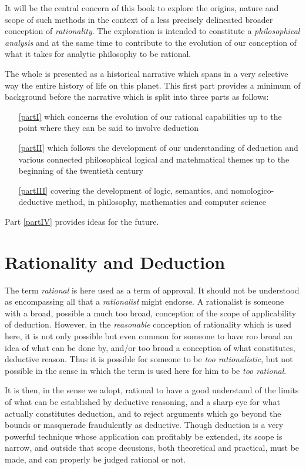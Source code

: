 It will be the central concern of this book to explore the origins, nature and scope of such methods in the context of a less precisely delineated broader conception of \emph{rationality}.
The exploration is intended to constitute a \emph{philosophical analysis} and at the same time to contribute to the evolution of our conception of what it takes for analytic philosophy to be rational.

The whole is presented as a historical narrative which spans in a very selective way the entire history of life on this planet.
This first part provides a minimum of background before the narrative which is split into three parts as follows:

\begin{itemize}
\item[\ref{partI}] which concerns the evolution of our rational capabilities up to the point where they can be said to involve deduction
\item[\ref{partII}] which follows the development of our understanding of deduction and various connected philosophical logical and matehmatical themes up to the beginning of the twentieth century
\item[\ref{partIII}] covering the development of logic, semantics, and nomologico-deductive method, in philosophy, mathematics and computer science
\end{itemize}

Part \ref{partIV} provides ideas for the future.

\section{Rationality and Deduction}

The term \emph{rational} is here used as a term of approval.
It should not be understood as encompassing all that a \emph{rationalist} might endorse.
A rationalist is someone with a broad, possible a much too broad, conception of the scope of applicability of deduction.
However, in the \emph{reasonable} conception of rationality which is used here, it is not only possible but even common for someone to have roo broad an idea of what can be done by, and/or too broad a conception of what constitutes, deductive reason.
Thus it is possible for someone to be \emph{too rationalistic}, but not possible in the sense in which the term is used here for him to be \emph{too rational}.

It is then, in the sense we adopt, rational to have a good understand of the limits of what can be established by deductive reasoning, and a sharp eye for what actually constitutes deduction, and to reject arguments which go beyond the bounds or masquerade fraudulently as deductive.
Though deduction is a very powerful technique whose application can profitably be extended, its scope is narrow, and outside that scope decusions, both theoretical and practical, must be made, and can properly be judged rational or not.

